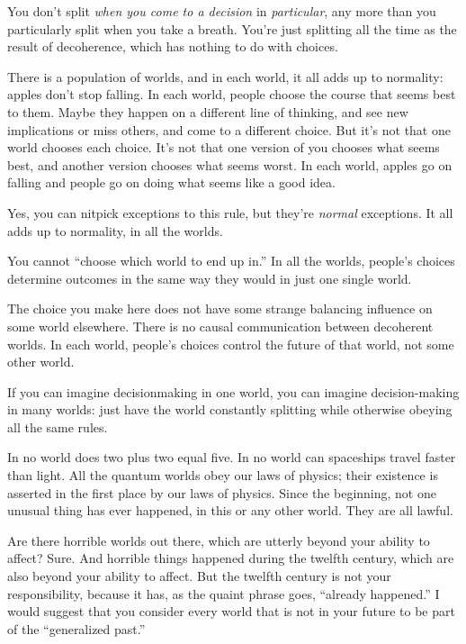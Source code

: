 {
 You don't split \textit{when you come to a
decision} in \textit{particular}, any more than you particularly split
when you take a breath. You're just splitting all the
time as the result of decoherence, which has nothing to do with
choices.}

{
 There is a population of worlds, and in each world, it all adds up
to normality: apples don't stop falling. In each world,
people choose the course that seems best to them. Maybe they happen on
a different line of thinking, and see new implications or miss others,
and come to a different choice. But it's not that one
world chooses each choice. It's not that one version of
you chooses what seems best, and another version chooses what seems
worst. In each world, apples go on falling and people go on doing what
seems like a good idea.}

{
 Yes, you can nitpick exceptions to this rule, but
they're \textit{normal} exceptions. It all adds up to
normality, in all the worlds.}

{
 You cannot ``choose which world to end up
in.'' In all the worlds, people's
choices determine outcomes in the same way they would in just one
single world.}

{
 The choice you make here does not have some strange balancing
influence on some world elsewhere. There is no causal communication
between decoherent worlds. In each world, people's
choices control the future of that world, not some other world.}

{
 If you can imagine decisionmaking in one world, you can imagine
decision-making in many worlds: just have the world constantly
splitting while otherwise obeying all the same rules.}

{
 In no world does two plus two equal five. In no world can
spaceships travel faster than light. All the quantum worlds obey our
laws of physics; their existence is asserted in the first place by our
laws of physics. Since the beginning, not one unusual thing has ever
happened, in this or any other world. They are all lawful.}

{
 Are there horrible worlds out there, which are utterly beyond your
ability to affect? Sure. And horrible things happened during the
twelfth century, which are also beyond your ability to affect. But the
twelfth century is not your responsibility, because it has, as the
quaint phrase goes, ``already
happened.'' I would suggest that you consider every
world that is not in your future to be part of the
``generalized past.''}

